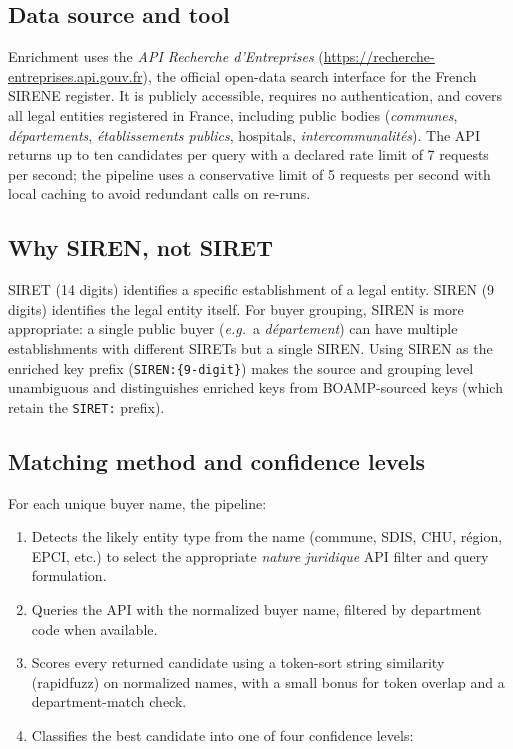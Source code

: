 \documentclass[11pt,a4paper]{article}
\begin{document}
\subsection{Data source and tool}

Enrichment uses the \emph{API Recherche d'Entreprises}
(\url{https://recherche-entreprises.api.gouv.fr}), the official open-data search
interface for the French SIRENE register. It is publicly accessible, requires no
authentication, and covers all legal entities registered in France, including
public bodies (\emph{communes}, \emph{départements}, \emph{établissements
publics}, hospitals, \emph{intercommunalités}). The API returns up to ten
candidates per query with a declared rate limit of 7 requests per second; the
pipeline uses a conservative limit of 5 requests per second with local caching
to avoid redundant calls on re-runs.

\subsection{Why SIREN, not SIRET}

SIRET (14 digits) identifies a specific establishment of a legal entity. SIREN
(9 digits) identifies the legal entity itself. For buyer grouping, SIREN is
more appropriate: a single public buyer (\emph{e.g.}\ a \emph{département})
can have multiple establishments with different SIRETs but a single SIREN. Using
SIREN as the enriched key prefix (\texttt{SIREN:\{9-digit\}}) makes the source
and grouping level unambiguous and distinguishes enriched keys from
BOAMP-sourced keys (which retain the \texttt{SIRET:} prefix).

\subsection{Matching method and confidence levels}

For each unique buyer name, the pipeline:
\begin{enumerate}[noitemsep]
  \item Detects the likely entity type from the name (commune, SDIS, CHU,
    région, EPCI, etc.) to select the appropriate \emph{nature juridique} API
    filter and query formulation.
  \item Queries the API with the normalized buyer name, filtered by department
    code when available.
  \item Scores every returned candidate using a token-sort string similarity
    (rapidfuzz) on normalized names, with a small bonus for token overlap and a
    department-match check.
  \item Classifies the best candidate into one of four confidence levels:
\end{enumerate}
\end{document}
